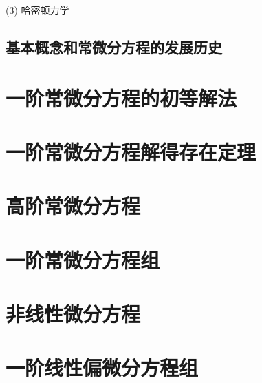 (3) 哈密顿力学

\subsection{基本概念和常微分方程的发展历史}

\section{一阶常微分方程的初等解法}
\section{一阶常微分方程解得存在定理}
\section{高阶常微分方程}
\section{一阶常微分方程组}
\section{非线性微分方程}
\section{一阶线性偏微分方程组}	
